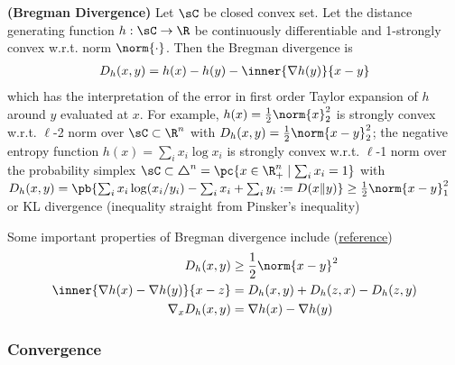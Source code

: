 \documentclass[../summary.tex]{subfiles}
\begin{document}
\begin{definition*}
    \textbf{(Bregman Divergence)} Let $\sC$ be closed convex set. Let the distance generating function $h:\sC\to\R$ be continuously differentiable and 1-strongly convex w.r.t. norm $\norm{\cdot}$. Then the Bregman divergence is 
    \begin{align*}
        D_h(x,y)
            = h(x) - h(y) - \inner{\nabla h(y)}{x-y}
    \end{align*}
    which has the interpretation of the error in first order Taylor expansion of $h$ around $y$ evaluated at $x$. For example, $h(x)=\frac{1}{2}\norm{x}_2^2$ is strongly convex w.r.t. $\ell$-2 norm over $\sC\subset\R^n$ with $D_h(x,y) = \frac{1}{2}\norm{x-y}_2^2$; the negative entropy function $h(x) = \sum_{i} x_i \log x_i$ is strongly convex w.r.t. $\ell$-1 norm over the probability simplex $\sC\subset \boldsymbol{\triangle}^n = \pc{x\in\R^n_{+} \mid \sum_i x_i = 1}$ with $D_h(x,y) = \pb{\sum_i x_i \log(x_i/y_i) - \sum_i x_i + \sum_i y_i := D(x\Vert y)} \geq \frac{1}{2}\norm{x-y}_1^2$ or KL divergence (inequality straight from Pinsker's inequality)
\end{definition*}
\noindent Some important properties of Bregman divergence include (\href{http://users.cecs.anu.edu.au/~xzhang/teaching/bregman.pdf}{reference})
\begin{align}
    D_h(x,y)
        &\geq \frac{1}{2}\norm{x-y}^2 
        \label{eq:bregman_norm_squared_lower_bound} \\
    \inner{\nabla h(x) - \nabla h(y)}{x-z}
        &= D_h(x,y) + D_h(z,x) - D_h(z,y)
        \label{eq:bregman_pythagoras_identity}  \\
    \nabla_x D_h(x,y) 
        &= \nabla h(x) - \nabla h(y)
        \label{eq:bregman_gradient_of_divergence}
\end{align}
 

\subsubsection{Convergence}
 
\end{document}
